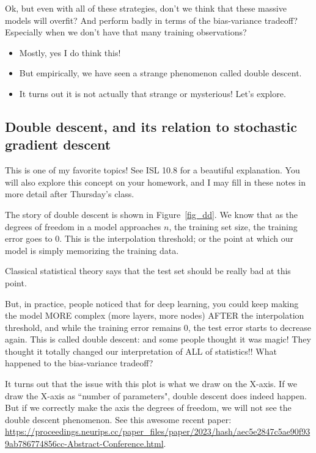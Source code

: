 Ok, but even with all of these strategies, don't we think that these massive models will overfit? And perform badly in terms of the bias-variance tradeoff? Especially when we don't have that many training observations? 
\begin{itemize}
\item Mostly, yes I do think this!
\item But empirically, we have seen a strange phenomenon called double descent.
\item It turns out it is not actually that strange or mysterious! Let's explore. 	
\end{itemize}


\subsection{Double descent, and its relation to stochastic gradient descent}

This is one of my favorite topics! See ISL 10.8 for a beautiful explanation. You will also explore this concept on your homework, and I may fill in these notes in more detail after Thursday's class. 

The story of double descent is shown in Figure~\ref{fig_dd}. We know that as the degrees of freedom in a model approaches $n$, the training set size, the training error goes to $0$. This is the interpolation threshold; or the point at which our model is simply memorizing the training data.

Classical statistical theory says that the test set should be really bad at this point.

But, in practice, people noticed that for deep learning, you could keep making the model MORE complex (more layers, more nodes) AFTER the interpolation threshold, and while the training error remains 0, the test error starts to decrease again. This is called double descent: and some people thought it was magic! They thought it totally changed our interpretation of ALL of statistics!! What happened to the bias-variance tradeoff?

It turns out that the issue with this plot is what we draw on the X-axis. If we draw the X-axis as ``number of parameters", double descent does indeed happen. But if we correctly make the axis the degrees of freedom, we will not see the double descent phenomenon. See this awesome recent paper: \url{https://proceedings.neurips.cc/paper_files/paper/2023/hash/aec5e2847c5ae90f939ab786774856cc-Abstract-Conference.html}. 

